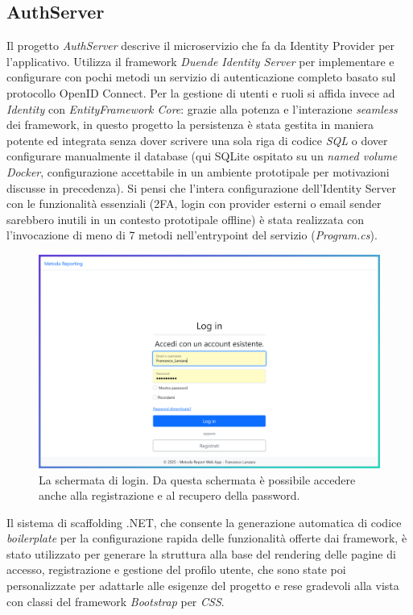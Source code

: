 \subsection{AuthServer}
Il progetto \emph{AuthServer} descrive il microservizio che fa da Identity Provider per l'applicativo. Utilizza il framework \emph{Duende Identity Server} per implementare e configurare con pochi metodi un servizio di autenticazione completo basato sul protocollo OpenID Connect. Per la gestione di utenti e ruoli si affida invece ad \emph{Identity} con \emph{EntityFramework Core}: grazie alla potenza e l'interazione \emph{seamless} dei framework, in questo progetto la persistenza è stata gestita in maniera potente ed integrata senza dover scrivere una sola riga di codice \emph{SQL} o dover configurare manualmente il database (qui SQLite ospitato su un \emph{named volume Docker}, configurazione accettabile in un ambiente prototipale per motivazioni discusse in precedenza). Si pensi che l'intera configurazione dell'Identity Server con le funzionalità essenziali (2FA, login con provider esterni o email sender sarebbero inutili in un contesto prototipale offline) è stata realizzata con l'invocazione di meno di 7 metodi nell'entrypoint del servizio (\emph{Program.cs}).
\begin{figure}[H]
        \centering
        \includegraphics[width=15.5cm]{fig/screen_login.png}
        \caption[Schermata login]{La schermata di login. Da questa schermata è possibile accedere anche alla registrazione e al recupero della password.}
\end{figure}
Il sistema di scaffolding .NET, che consente la generazione automatica di codice \emph{boilerplate} per la configurazione rapida delle funzionalità offerte dai framework, è stato utilizzato per generare la struttura alla base del rendering delle pagine di accesso, registrazione e gestione del profilo utente, che sono state poi personalizzate per adattarle alle esigenze del progetto e rese gradevoli alla vista con classi del framework \emph{Bootstrap} per \emph{CSS}.
